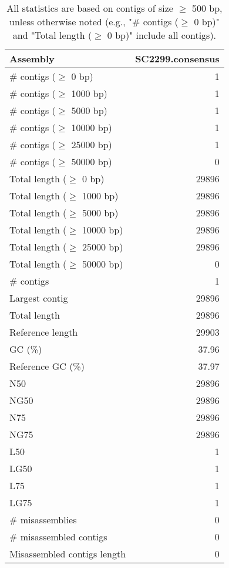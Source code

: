 \documentclass[12pt,a4paper]{article}
\begin{document}
\begin{table}[ht]
\begin{center}
\caption{All statistics are based on contigs of size $\geq$ 500 bp, unless otherwise noted (e.g., "\# contigs ($\geq$ 0 bp)" and "Total length ($\geq$ 0 bp)" include all contigs).}
\begin{tabular}{|l*{1}{|r}|}
\hline
Assembly & SC2299.consensus \\ \hline
\# contigs ($\geq$ 0 bp) & 1 \\ \hline
\# contigs ($\geq$ 1000 bp) & 1 \\ \hline
\# contigs ($\geq$ 5000 bp) & 1 \\ \hline
\# contigs ($\geq$ 10000 bp) & 1 \\ \hline
\# contigs ($\geq$ 25000 bp) & 1 \\ \hline
\# contigs ($\geq$ 50000 bp) & 0 \\ \hline
Total length ($\geq$ 0 bp) & 29896 \\ \hline
Total length ($\geq$ 1000 bp) & 29896 \\ \hline
Total length ($\geq$ 5000 bp) & 29896 \\ \hline
Total length ($\geq$ 10000 bp) & 29896 \\ \hline
Total length ($\geq$ 25000 bp) & 29896 \\ \hline
Total length ($\geq$ 50000 bp) & 0 \\ \hline
\# contigs & 1 \\ \hline
Largest contig & 29896 \\ \hline
Total length & 29896 \\ \hline
Reference length & 29903 \\ \hline
GC (\%) & 37.96 \\ \hline
Reference GC (\%) & 37.97 \\ \hline
N50 & 29896 \\ \hline
NG50 & 29896 \\ \hline
N75 & 29896 \\ \hline
NG75 & 29896 \\ \hline
L50 & 1 \\ \hline
LG50 & 1 \\ \hline
L75 & 1 \\ \hline
LG75 & 1 \\ \hline
\# misassemblies & 0 \\ \hline
\# misassembled contigs & 0 \\ \hline
Misassembled contigs length & 0 \\ \hline

\end{tabular}
\end{center}
\end{table}
\end{document}
